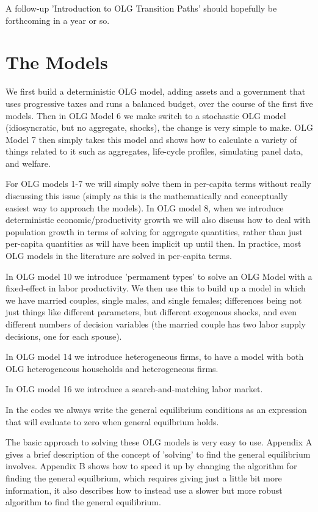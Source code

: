\documentclass[11pt]{article}%
\begin{document}
A follow-up 'Introduction to OLG Transition Paths' should hopefully be forthcoming in a year or so.

\newpage
\section{The Models}
We first build a deterministic OLG model, adding assets and a government that uses progressive taxes and runs a balanced budget, over the course of the first five models. Then in OLG Model 6 we make switch to a stochastic OLG model (idiosyncratic, but no aggregate, shocks), the change is very simple to make. OLG Model 7 then simply takes this model and shows how to calculate a variety of things related to it such as aggregates, life-cycle profiles, simulating panel data, and welfare.

For OLG models 1-7 we will simply solve them in per-capita terms without really discussing this issue (simply as this is the mathematically and conceptually easiest way to approach the models). In OLG model 8, when we introduce deterministic economic/productivity growth we will also discuss how to deal with population growth in terms of solving for aggregate quantities, rather than just per-capita quantities as will have been implicit up until then. In practice, most OLG models in the literature are solved in per-capita terms.

In OLG model 10 we introduce 'permament types' to solve an OLG Model with a fixed-effect in labor productivity. We then use this to build up a model in which we have married couples, single males, and single females; differences being not just things like different parameters, but different exogenous shocks, and even different numbers of decision variables (the married couple has two labor supply decisions, one for each spouse).

In OLG model 14 we introduce heterogeneous firms, to have a model with both OLG heterogeneous households and heterogeneous firms.

In OLG model 16 we introduce a search-and-matching labor market.

In the codes we always write the general equilibrium conditions as an expression that will evaluate to zero when general equilbrium holds.

The basic approach to solving these OLG models is very easy to use. Appendix A gives a brief description of the concept of 'solving' to find the general equilibrium involves. Appendix B shows how to speed it up by changing the algorithm for finding the general equilbrium, which requires giving just a little bit more information, it also describes how to instead use a slower but more robust algorithm to find the general equilibrium.
\end{document}

